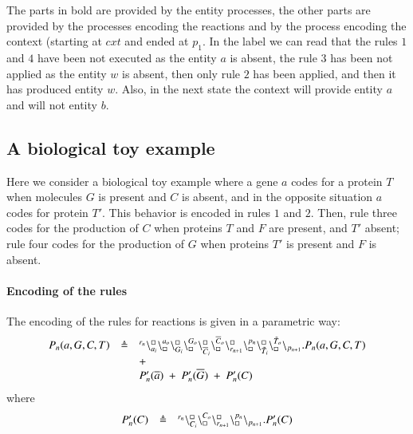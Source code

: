 The parts in bold are provided by the entity processes, the other parts are provided by the processes encoding the reactions and by the process encoding the context (starting at $cxt$ and ended at $p_1$.
In the label we can read that the rules $1$ and $4$ have been not executed as the entity $a$ is absent, 
the rule $3$ has been not applied as the entity $w$ is absent, then only rule $2$ has been applied, and then it has produced entity $w$. Also, in the next state the context will provide entity $a$ and will not entity $b$.

\subsection{A  biological toy example}\label{subsec:toy}


Here we consider a biological toy example where a gene $a$  codes for a protein $T$ when molecules 
$G$ is present and $C$ is absent, and in the opposite situation $a$ codes for protein $T'$.
This behavior is encoded in rules $1$ and $2$.
Then, rule three codes for the production of $C$ when proteins $T$ and $F$ are present, and $T'$ absent;
rule four codes for the production of $G$ when  proteins $T'$ is present and $F$ is absent.

\paragraph{Encoding of the rules}

The encoding of the rules for reactions is  given in a parametric way:
\[
\begin{array}{lcl}
P_n(a,G,C,T) & \triangleq &{}^{r_n}\backslash_{a_i}^{\scriptstyle {\square}}\backslash_{\scriptstyle {\square}}^{a_o}
                                                    \backslash_{G_i}^{\scriptstyle {\square}}\backslash_{\scriptstyle {\square}}^{G_o}
                                                     \backslash_{\overline{C}_i}^{\scriptstyle {\square}}\backslash_{\scriptstyle {\square}}^{\overline{C}_o}
					        \backslash_{r_{n+1}}^{\scriptstyle {\square}}\backslash_{\scriptstyle {\square}}^{p_n}
					        \backslash_{\tilde{T}_i}^{\scriptstyle {\square}}\backslash_{\scriptstyle {\square}}^{\tilde{T}_o}
			\backslash_{p_{n+1}}.P_n(a,G,C,T)  \\
				&& +\\
			&&P_n'(\overline{a}) \ +\ P_n'(\overline{G}) \ + \ P_n'(C)\\
			\end{array}
			\]
			\noindent
			where
			\[
\begin{array}{lcl}
P_n'(C) &\triangleq &  {}^{r_n}\backslash_{C_i}^{\scriptstyle {\square}}\backslash_{\scriptstyle {\square}}^{C_o}\backslash_{r_{n+1}}^{\scriptstyle {\square}}\backslash_{\scriptstyle {\square}}^{p_n} \backslash_{p_{n+1}}.P_n'(C) 
\end{array}
\]

